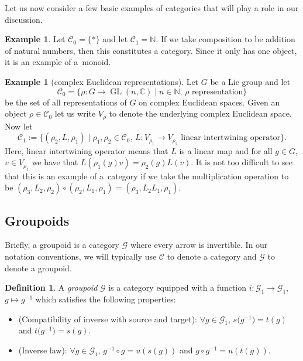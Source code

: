 \documentclass[pdftex]{sigma}
\numberwithin{equation}{section}
\theoremstyle{definition}
\newtheorem{Definition}[Theorem]{Definition}
\newtheorem{Example}[Theorem]{Example}
\newcommand{\BBC}{\mathbb{C}}
\newcommand{\BBN}{\mathbb{N}}
\newcommand{\CG}{\mathcal{G}}
\newcommand{\CC}{\mathcal{C}}
\newcommand{\inv}{^{-1}}
\DeclareMathOperator{\GL}{GL}
\begin{document}
Let us now consider a few basic examples of categories that will play a role in our discussion.
\begin{Example}
   Let $ \CC_0 = \{ * \} $ and let $ \CC_1 = \BBN $. If we take composition to be addition of natural numbers, then this constitutes a category. Since it only has one object, it is an example of a~monoid.
\end{Example}
\begin{Example}[complex Euclidean representations]
  Let $ G $ be a Lie group and let
  \[ \CC_0 = \{ \rho \colon G \to \GL(n,\BBC) \mid n \in \BBN,\, \rho \text{ representation} \} \]
   be the set of all representations of $ G $ on complex Euclidean spaces. Given an object $ \rho \in \CC_0 $ let us write $ V_\rho $ to denote the underlying complex Euclidean space. Now let
  \[ \CC_1 := \{ (\rho_2, L, \rho_1) \mid \rho_1, \rho_2 \in \CC_0, \, L \colon V_{\rho_1} \to V_{\rho_2} \text{ linear intertwining operator} \}. \]
  Here, linear intertwining operator means that $ L $ is a linear map and for all $ g \in G $, $ v \in V_{\rho_1} $ we have that
  $ L(\rho_1(g) v) = \rho_2(g) L(v)$.
  It is not too difficult to see that this is an example of a~category if we take the multiplication operation to be
 $(\rho_3, L_2, \rho_2) \circ (\rho_2, L_1, \rho_1 ) = (\rho_3, L_2 L_1, \rho_1 )$.
\end{Example}


\subsection{Groupoids}
Briefly, a groupoid is a category $ \CG $ where every arrow is invertible. In our notation conventions, we will typically use $ \CC $ to denote a category and $ \CG $ to denote a groupoid.
\begin{Definition}
A \emph{groupoid} $ \CG $ is a category equipped with a function
$i \colon \CG_1 \to \CG_1$, $g \mapsto g\inv$
which satisfies the following properties:
\begin{itemize}\itemsep=0pt
  \item (Compatibility of inverse with source and target):
  $\forall g \in \CG_1$, $ s\big(g\inv\big) = t(g)$ and \linebreak $t\big(g\inv\big) = s(g)$.
  \item (Inverse law):
  $\forall g \in \CG_1$, $ g\inv \circ g = u(s(g))$ and $g \circ g\inv = u(t(g))$.
\end{itemize}
\end{Definition}
\end{document}
